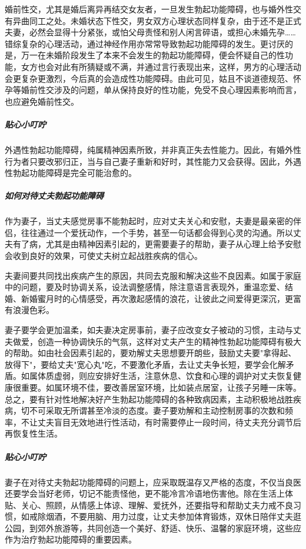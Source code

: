 婚前性交，尤其是婚后离异再结交女友者，一旦发生勃起功能障碍，也与婚外性交有异曲同工之处。未婚状态下性交，男女双方心理状态同样复杂，由于还不是正式夫妻，必然会显得十分紧张，或怕父母责怪和别人闲言碎语，或担心未婚先孕……错综复杂的心理活动，通过神经作用亦常常导致勃起功能障碍的发生。更讨厌的是，万一在未婚阶段发生了本来不会发生的勃起功能障碍，便会怀疑自己的性功能，女方也会对此有所猜疑或不满，并通过言行表现出来，这样，男方的心理活动会更复杂更激烈，今后真的会造成性功能障碍。由此可见，姑且不谈道德规范、怀孕等婚前性交涉及的问题，单从保持良好的性功能，免受不良心理因素影响而言，也应避免婚前性交。

\subparagraph{贴心小叮咛}

外遇性勃起功能障碍，纯属精神因素所致，并非真正失去性能力。因此，有婚外性行为者只要改邪归正，当与自己妻子重新和好时，其性能力又会获得。因此，外遇性勃起功能障碍是完全可能治愈的。

\subparagraph{如何对待丈夫勃起功能障碍}

作为妻子，当丈夫感觉房事不能勃起时，应对丈夫关心和安慰，夫妻是最亲密的伴侣，往往通过一个爱抚动作，一个手势，甚至一句话都会得到心灵的沟通。所以丈夫有了病，尤其是由精神因素引起的，更需要妻子的帮助，妻子从心理上给予安慰会收到良好的效果，可使丈夫树立起战胜疾病的信心。

夫妻间要共同找出疾病产生的原因，共同去克服和解决这些不良因素。如属于家庭中的问题，要及时协调关系，设法调整感情，除注意语言表现外，重温恋爱、结婚、新婚蜜月时的心情感受，再次激起感情的浪花，让彼此之间爱得更深沉，更富有浪漫色彩。

妻子要学会更加温柔，如夫妻决定房事前，妻子应改变女子被动的习惯，主动与丈夫做爱，创造一种协调快乐的气氛，这样对丈夫产生的精神性勃起功能障碍有极大的帮助。如由社会因素引起的，要劝解丈夫思想要开朗些，鼓励丈夫要"拿得起、放得下"，要给丈夫"宽心丸"吃，不要激化矛盾，去让丈夫争长短，要学会化解矛盾。如属体质虚弱，则应安排好生活，注意休息、饮食和心理的调护对丈夫恢复健康很重要。如属环境不佳，要改善居室环境，比如装点居室，让孩子另睡一床等。总之，要有针对性地解决好产生勃起功能障碍的各种致病因素，主动积极地战胜疾病，切不可采取无所谓甚至冷淡的态度。妻子要劝解和主动控制房事的次数和频率，不让丈夫盲目无效地进行性活动，有时需要停止一段时间，待丈夫充分调节后再恢复性生活。

\subparagraph{贴心小叮咛}

妻子在对待丈夫勃起功能障碍的问题上，应采取既温存又严格的态度，不仅当良医还要学会当好老师，切记不能责怪他，更不能冷言冷语地伤害他。除在生活上体贴、关心、照顾，从情感上体谅、理解、爱抚外，还要指导和帮助丈夫力戒不良习惯，如戒除烟酒，不要用脑、用力过度，让丈夫参加体育锻炼，双休日陪伴丈夫逛公园，到郊外旅游等，共同创造一个美好、舒适、快乐、温馨的家庭环境，这些应作为治疗勃起功能障碍的重要因素。

